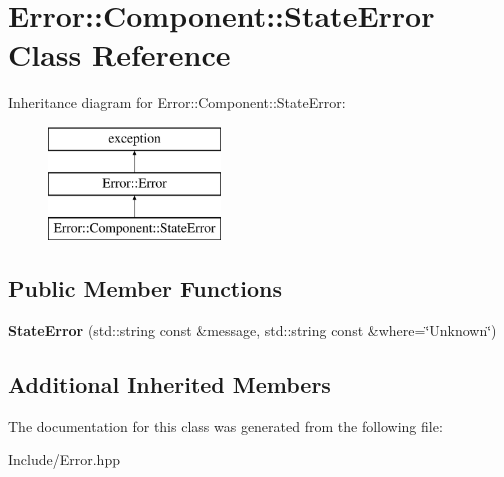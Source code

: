 \hypertarget{classError_1_1Component_1_1StateError}{}\section{Error\+:\+:Component\+:\+:State\+Error Class Reference}
\label{classError_1_1Component_1_1StateError}
Inheritance diagram for Error\+:\+:Component\+:\+:State\+Error\+:\begin{figure}[H]
\begin{center}
\leavevmode
\includegraphics[height=3.000000cm]{classError_1_1Component_1_1StateError}
\end{center}
\end{figure}
\subsection*{Public Member Functions}
\begin{DoxyCompactItemize}
\item 
\mbox{\label{classError_1_1Component_1_1StateError_a856431742c76b2631bc17c367b34a0f4}} 
{\bfseries State\+Error} (std\+::string const \&message, std\+::string const \&where=\char`\"{}Unknown\char`\"{})
\end{DoxyCompactItemize}
\subsection*{Additional Inherited Members}


The documentation for this class was generated from the following file\+:\begin{DoxyCompactItemize}
\item 
Include/Error.\+hpp\end{DoxyCompactItemize}
